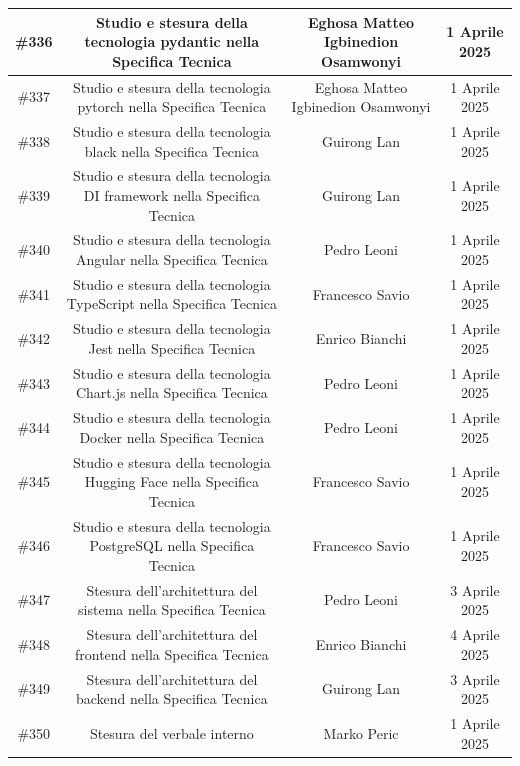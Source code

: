 \documentclass[a4paper, 12pt]{article}
\begin{document}
\begin{tabularx}{\textwidth}{|c|C|C|C|}
    \hline
        \#336 & Studio e stesura della tecnologia pydantic nella Specifica Tecnica & Eghosa Matteo Igbinedion Osamwonyi & 1 Aprile 2025 \\
    \hline
        \#337 & Studio e stesura della tecnologia pytorch nella Specifica Tecnica & Eghosa Matteo Igbinedion Osamwonyi & 1 Aprile 2025 \\
    \hline
        \#338 & Studio e stesura della tecnologia black nella Specifica Tecnica & Guirong Lan & 1 Aprile 2025\\
    \hline
        \#339 & Studio e stesura della tecnologia DI framework nella Specifica Tecnica & Guirong Lan & 1 Aprile 2025 \\
    \hline
        \#340 & Studio e stesura della tecnologia Angular nella Specifica Tecnica & Pedro Leoni & 1 Aprile 2025 \\
    \hline
        \#341 & Studio e stesura della tecnologia TypeScript nella Specifica Tecnica & Francesco Savio & 1 Aprile 2025 \\
    \hline
        \#342 & Studio e stesura della tecnologia Jest nella Specifica Tecnica & Enrico Bianchi & 1 Aprile 2025 \\
    \hline
        \#343 & Studio e stesura della tecnologia Chart.js nella Specifica Tecnica & Pedro Leoni & 1 Aprile 2025 \\
    \hline
        \#344 & Studio e stesura della tecnologia Docker nella Specifica Tecnica & Pedro Leoni & 1 Aprile 2025 \\
    \hline
        \#345 & Studio e stesura della tecnologia Hugging Face nella Specifica Tecnica & Francesco Savio & 1 Aprile 2025 \\
    \hline
        \#346 & Studio e stesura della tecnologia PostgreSQL nella Specifica Tecnica & Francesco Savio & 1 Aprile 2025 \\
    \hline
        \#347 & Stesura dell'architettura del sistema nella Specifica Tecnica & Pedro Leoni & 3 Aprile 2025 \\
    \hline
        \#348 & Stesura dell'architettura del frontend nella Specifica Tecnica & Enrico Bianchi & 4 Aprile 2025 \\
    \hline
        \#349 & Stesura dell'architettura del backend nella Specifica Tecnica & Guirong Lan & 3 Aprile 2025 \\
    \hline
        \#350 & Stesura del verbale interno & Marko Peric & 1 Aprile 2025\\
    \hline

 \end{tabularx}
\end{document}
